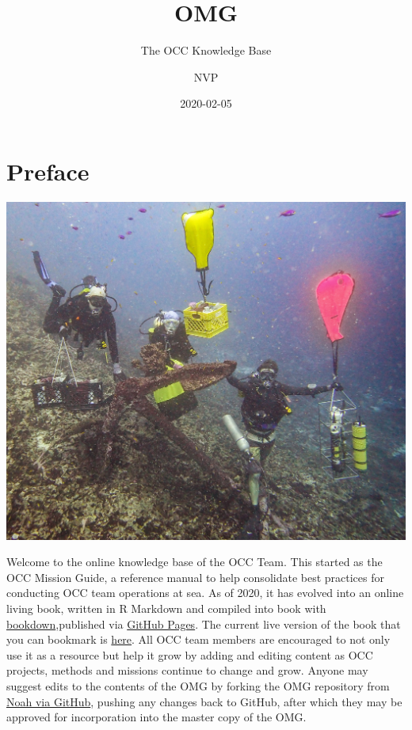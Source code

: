 \documentclass[]{book}
\title{OMG}
\subtitle{The OCC Knowledge Base}
\author{NVP}
\date{2020-02-05}
\begin{document}
\maketitle

{
\setcounter{tocdepth}{1}
\tableofcontents
}
\hypertarget{preface}{%
\chapter*{Preface}\label{preface}}

\includegraphics{images/OCC_Diurnal_Suite_Recovery_CJS.jpg}

Welcome to the online knowledge base of the OCC Team. This started as the OCC Mission Guide, a reference manual to help consolidate best practices for conducting OCC team operations at sea. As of 2020, it has evolved into an online living book, written in R Markdown and compiled into book with \href{https://bookdown.org/yihui/bookdown/}{bookdown},published via \href{https://pages.github.com/}{GitHub Pages}. The current live version of the book that you can bookmark is \href{https://npomeroy.github.io/OMG/}{here}. All OCC team members are encouraged to not only use it as a resource but help it grow by adding and editing content as OCC projects, methods and missions continue to change and grow. Anyone may suggest edits to the contents of the OMG by forking the OMG repository from \href{https://github.com/npomeroy/OMG}{Noah via GitHub}, pushing any changes back to GitHub, after which they may be approved for incorporation into the master copy of the OMG.
\end{document}
